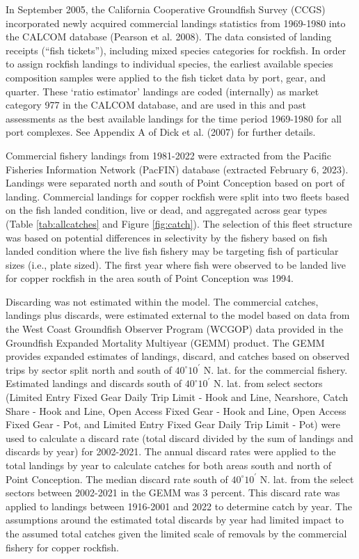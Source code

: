 \documentclass[11pt,
  english,
  letterpaper,
]{article}
\begin{document}
In September 2005, the California Cooperative Groundfish Survey (CCGS) incorporated newly acquired commercial landings statistics from 1969-1980 into the CALCOM database (Pearson et al. 2008). The data consisted of landing receipts (``fish tickets''), including mixed species categories for rockfish. In order to assign rockfish landings to individual species, the earliest available species composition samples were applied to the fish ticket data by port, gear, and quarter. These `ratio estimator' landings are coded (internally) as market category 977 in the CALCOM database, and are used in this and past assessments as the best available landings for the time period 1969-1980 for all port complexes. See Appendix A of Dick et al. (2007) for further details.

Commercial fishery landings from 1981-2022 were extracted from the Pacific Fisheries Information Network (PacFIN) database (extracted February 6, 2023). Landings were separated north and south of Point Conception based on port of landing. Commercial landings for copper rockfish were split into two fleets based on the fish landed condition, live or dead, and aggregated across gear types (Table \ref{tab:allcatches} and Figure \ref{fig:catch}). The selection of this fleet structure was based on potential differences in selectivity by the fishery based on fish landed condition where the live fish fishery may be targeting fish of particular sizes (i.e., plate sized). The first year where fish were observed to be landed live for copper rockfish in the area south of Point Conception was 1994.

Discarding was not estimated within the model. The commercial catches, landings plus discards, were estimated external to the model based on data from the West Coast Groundfish Observer Program (WCGOP) data provided in the Groundfish Expanded Mortality Multiyear (GEMM) product. The GEMM provides expanded estimates of landings, discard, and catches based on observed trips by sector split north and south of $40^\circ 10^\prime$ N. lat. for the commercial fishery. Estimated landings and discards south of $40^\circ 10^\prime$ N. lat. from select sectors (Limited Entry Fixed Gear Daily Trip Limit - Hook and Line, Nearshore, Catch Share - Hook and Line, Open Access Fixed Gear - Hook and Line, Open Access Fixed Gear - Pot, and Limited Entry Fixed Gear Daily Trip Limit - Pot) were used to calculate a discard rate (total discard divided by the sum of landings and discards by year) for 2002-2021. The annual discard rates were applied to the total landings by year to calculate catches for both areas south and north of Point Conception. The median discard rate south of $40^\circ 10^\prime$ N. lat. from the select sectors between 2002-2021 in the GEMM was 3 percent. This discard rate was applied to landings between 1916-2001 and 2022 to determine catch by year. The assumptions around the estimated total discards by year had limited impact to the assumed total catches given the limited scale of removals by the commercial fishery for copper rockfish.
\end{document}
